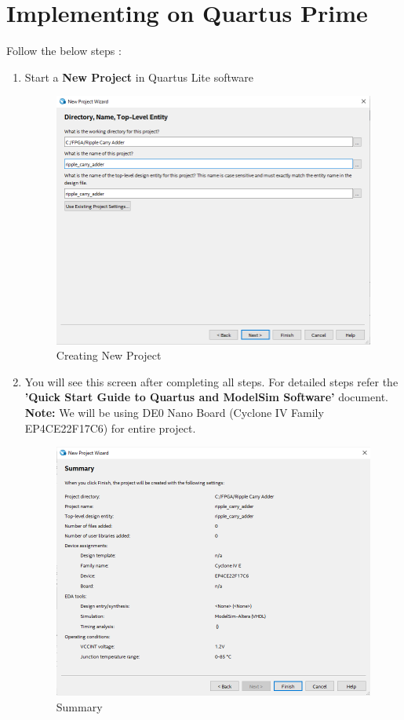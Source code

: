 \documentclass[12pt,singleside,a4paper]{article}
\begin{document}
\newpage
\section{Implementing on Quartus Prime}
 
Follow the below steps : 

\begin{enumerate}
    \item Start a \textbf{New Project} in Quartus Lite software
    \begin{figure}[H]
    \centering
    \includegraphics[width=14cm,keepaspectratio]{img1.png}
    \caption{Creating New Project}
    \end{figure}
    
    \newpage
    \item You will see this screen after completing all steps. For detailed steps refer the \textbf{'Quick Start Guide to Quartus and ModelSim Software'} document.
    \newline
    \textbf{Note:} We will be using DE0 Nano Board (Cyclone IV Family EP4CE22F17C6) for entire project.
    \begin{figure}[H]
    \centering
    \includegraphics[width=14cm,keepaspectratio]{img2.png}
    \caption{Summary}
    \end{figure}
    

\end{enumerate}
\end{document}
